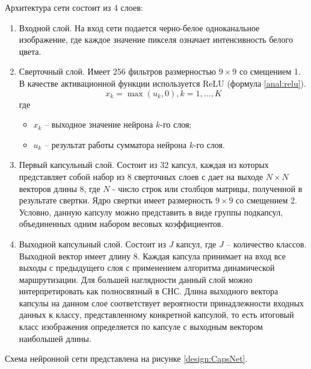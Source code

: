 Архитектура сети состоит из 4 слоев:

\begin{enumerate}
	\item Входной слой. На вход сети подается черно-белое одноканальное изображение, где каждое значение пикселя означает интенсивность белого цвета.
	\item Сверточный слой. Имеет 256 фильтров размерностью $9 \times 9$ со смещением 1.	В качестве активационной функции используется ReLU (формула \ref{anal:relu}).
	\begin{equation}
	x_{k} = \max(u_{k}, 0), k = 1, ..., K
	\label{anal:relu}
	\end{equation}
	где 
	\begin{itemize}
		\item $x_k$ -- выходное значение нейрона $k$-го слоя;
		\item $u_k$ -- результат работы сумматора нейрона $k$-го слоя.
	\end{itemize}
	\item Первый капсульный слой. Состоит из 32 капсул, каждая из которых представляет собой набор из 8 сверточных слоев с дает на выходе $N \times N$ векторов длины 8, где $N$ - число строк или столбцов матрицы, полученной в результате свертки. Ядро свертки имеет размерность $9 \times 9$ со смещением 2. Условно, данную капсулу можно представить в виде группы подкапсул, объединенных одним набором весовых коэффициентов.
	\item Выходной капсульный слой. Состоит из $J$ капсул, где $J$ -- количество классов. Выходной вектор имеет длину 8. Каждая капсула принимает на вход все выходы с предыдущего слоя с применением алгоритма динамической маршрутизации. Для большей наглядности данный слой можно интерпретировать как полносвязный в СНС. Длина выходного вектора капсулы на данном слое соответствует вероятности принадлежности входных данных к классу, представленному конкретной капсулой, то есть итоговый класс изображения определяется по капсуле с выходным вектором наибольшей длины.
\end{enumerate}

Схема нейронной сети представлена на рисунке \ref{design:CapsNet}.

